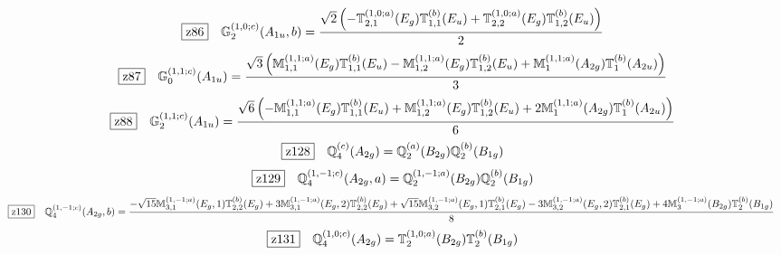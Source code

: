 \documentclass[fleqn,10pt,landscape]{jsarticle}
\begin{document}
\begin{dmath*}
\hspace*{3mm}\fbox{z86}\quad \mathbb{G}_{2}^{(1,0;c)}(A_{1u},b)=\frac{\sqrt{2} \left(- \mathbb{T}_{2,1}^{(1,0;a)}(E_{g}) \mathbb{T}_{1,1}^{(b)}(E_{u}) + \mathbb{T}_{2,2}^{(1,0;a)}(E_{g}) \mathbb{T}_{1,2}^{(b)}(E_{u})\right)}{2}
\end{dmath*}
\begin{dmath*}
\hspace*{3mm}\fbox{z87}\quad \mathbb{G}_{0}^{(1,1;c)}(A_{1u})=\frac{\sqrt{3} \left(\mathbb{M}_{1,1}^{(1,1;a)}(E_{g}) \mathbb{T}_{1,1}^{(b)}(E_{u}) - \mathbb{M}_{1,2}^{(1,1;a)}(E_{g}) \mathbb{T}_{1,2}^{(b)}(E_{u}) + \mathbb{M}_{1}^{(1,1;a)}(A_{2g}) \mathbb{T}_{1}^{(b)}(A_{2u})\right)}{3}
\end{dmath*}
\begin{dmath*}
\hspace*{3mm}\fbox{z88}\quad \mathbb{G}_{2}^{(1,1;c)}(A_{1u})=\frac{\sqrt{6} \left(- \mathbb{M}_{1,1}^{(1,1;a)}(E_{g}) \mathbb{T}_{1,1}^{(b)}(E_{u}) + \mathbb{M}_{1,2}^{(1,1;a)}(E_{g}) \mathbb{T}_{1,2}^{(b)}(E_{u}) + 2 \mathbb{M}_{1}^{(1,1;a)}(A_{2g}) \mathbb{T}_{1}^{(b)}(A_{2u})\right)}{6}
\end{dmath*}
\begin{dmath*}
\hspace*{3mm}\fbox{z128}\quad \mathbb{Q}_{4}^{(c)}(A_{2g})=\mathbb{Q}_{2}^{(a)}(B_{2g}) \mathbb{Q}_{2}^{(b)}(B_{1g})
\end{dmath*}
\begin{dmath*}
\hspace*{3mm}\fbox{z129}\quad \mathbb{Q}_{4}^{(1,-1;c)}(A_{2g},a)=\mathbb{Q}_{2}^{(1,-1;a)}(B_{2g}) \mathbb{Q}_{2}^{(b)}(B_{1g})
\end{dmath*}
\begin{dmath*}
\hspace*{3mm}\fbox{z130}\quad \mathbb{Q}_{4}^{(1,-1;c)}(A_{2g},b)=\frac{- \sqrt{15} \mathbb{M}_{3,1}^{(1,-1;a)}(E_{g},1) \mathbb{T}_{2,2}^{(b)}(E_{g}) + 3 \mathbb{M}_{3,1}^{(1,-1;a)}(E_{g},2) \mathbb{T}_{2,2}^{(b)}(E_{g}) + \sqrt{15} \mathbb{M}_{3,2}^{(1,-1;a)}(E_{g},1) \mathbb{T}_{2,1}^{(b)}(E_{g}) - 3 \mathbb{M}_{3,2}^{(1,-1;a)}(E_{g},2) \mathbb{T}_{2,1}^{(b)}(E_{g}) + 4 \mathbb{M}_{3}^{(1,-1;a)}(B_{2g}) \mathbb{T}_{2}^{(b)}(B_{1g})}{8}
\end{dmath*}
\begin{dmath*}
\hspace*{3mm}\fbox{z131}\quad \mathbb{Q}_{4}^{(1,0;c)}(A_{2g})=\mathbb{T}_{2}^{(1,0;a)}(B_{2g}) \mathbb{T}_{2}^{(b)}(B_{1g})
\end{dmath*}
\end{document}
